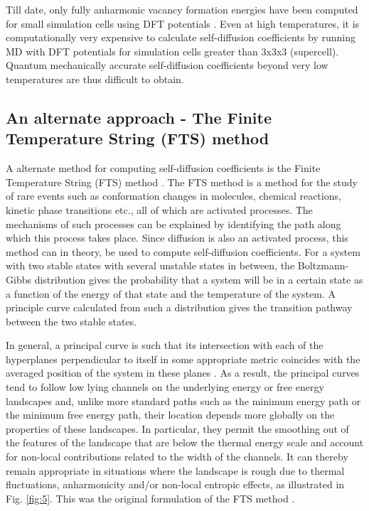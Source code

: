 \documentclass{article}
\begin{document}
Till date, only fully anharmonic vacancy formation energies have been computed for small simulation cells using DFT potentials \cite{Glensk2013}. Even at high temperatures, it is computationally very expensive to calculate self-diffusion coefficients by running MD with DFT potentials for simulation cells greater than 3x3x3 (supercell). Quantum mechanically accurate self-diffusion coefficients beyond very low temperatures are thus difficult to obtain.

\subsection{An alternate approach - The Finite Temperature String (FTS) method}

A alternate method for computing self-diffusion coefficients is the Finite Temperature String (FTS) method \cite{Weinan2005, Vanden-Eijnden2009}. The FTS method is a method for the study of rare events such as conformation changes in molecules, chemical reactions, kinetic phase transitions etc., all of which are activated processes. The mechanisms of such processes can be explained by identifying the path along which this process takes place. Since diffusion is also an activated process, this method can in theory, be used to compute self-diffusion coefficients. For a system with two stable states with several unstable states in between, the Boltzmann-Gibbs distribution gives the probability that a system will be in a certain state as a function of the energy of that state and the temperature of the system. A principle curve \cite{Hastie1989} calculated from such a distribution gives the transition pathway between the two stable states. 

In general, a principal curve is such that its intersection with each of the hyperplanes perpendicular to itself in some appropriate metric coincides with the averaged position of the system in these planes \cite{Hastie1989}. As a result, the principal curves tend to follow low lying channels on the underlying energy or free energy landscapes and, unlike more standard paths such as the minimum energy path or the minimum free energy path, their location depends more globally on the properties of these landscapes. In particular, they permit the smoothing out of the features of the landscape that are below the thermal energy scale and account for non-local contributions related to the width of the channels. It can thereby remain appropriate in situations where the landscape is rough due to thermal fluctuations, anharmonicity and/or non-local entropic effects, as illustrated in Fig. \ref{fig:5}. This was the original formulation of the FTS method \cite{Weinan2005}.
\end{document}
